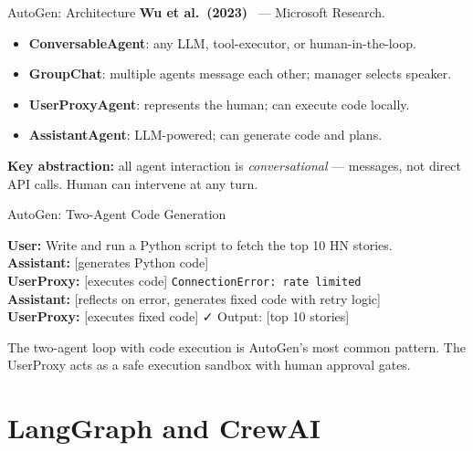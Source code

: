\documentclass[aspectratio=169,10pt]{beamer}
\begin{document}
\begin{frame}{AutoGen: Architecture}
  \textbf{Wu et al.\ (2023)}~\cite{wu2023autogen} — Microsoft Research.
  \vspace{0.4em}
  \begin{tcolorbox}[hitbox, title=AutoGen Primitives]
    \begin{itemize}
      \item \textbf{ConversableAgent}: any LLM, tool-executor, or human-in-the-loop.
      \item \textbf{GroupChat}: multiple agents message each other; manager selects speaker.
      \item \textbf{UserProxyAgent}: represents the human; can execute code locally.
      \item \textbf{AssistantAgent}: LLM-powered; can generate code and plans.
    \end{itemize}
  \end{tcolorbox}
  \vspace{0.3em}
  \textbf{Key abstraction:} all agent interaction is \emph{conversational} — messages, not direct API calls.
  Human can intervene at any turn.
\end{frame}

\begin{frame}{AutoGen: Two-Agent Code Generation}
  \begin{tcolorbox}[hitbox]
    \textbf{User:} Write and run a Python script to fetch the top 10 HN stories.\\[4pt]
    \textbf{Assistant:} [generates Python code]\\[4pt]
    \textbf{UserProxy:} [executes code] \texttt{ConnectionError: rate limited}\\[4pt]
    \textbf{Assistant:} [reflects on error, generates fixed code with retry logic]\\[4pt]
    \textbf{UserProxy:} [executes fixed code] ✓ Output: [top 10 stories]
  \end{tcolorbox}
  \vspace{0.3em}
  The two-agent loop with code execution is AutoGen's most common pattern.
  The UserProxy acts as a safe execution sandbox with human approval gates.
\end{frame}

\section{LangGraph and CrewAI}
\end{document}
